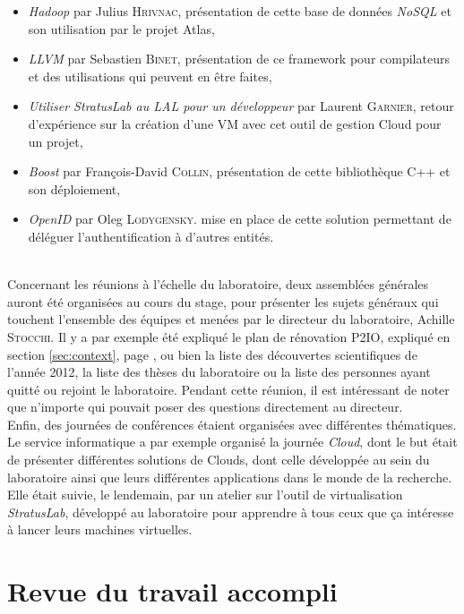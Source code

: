 \documentclass[12pt,a4paper,twoside]{report}
\begin{document}
\begin{itemize}
	\item \emph{Hadoop} par Julius \textsc{Hrivnac}, présentation de cette base
	de données \emph{NoSQL} et son utilisation par le projet Atlas,
	\item \emph{LLVM} par Sebastien \textsc{Binet}, présentation de ce
	framework pour compilateurs et des utilisations qui peuvent en être faites,
	\item \emph{Utiliser StratusLab au LAL pour un développeur} par Laurent
	\textsc{Garnier}, retour d’expérience sur la création d’une VM avec cet
	outil de gestion Cloud pour un projet,
	\item \emph{Boost} par François-David \textsc{Collin}, présentation de
	cette bibliothèque C++ et son déploiement,
	\item \emph{OpenID} par Oleg \textsc{Lodygensky}. mise en place de cette
	solution permettant de déléguer l’authentification à d’autres entités.
\end{itemize}
~\\

Concernant les réunions à l’échelle du laboratoire, deux assemblées générales
auront été organisées au cours du stage, pour présenter les sujets généraux qui
touchent l’ensemble des équipes et menées par le directeur du laboratoire,
Achille \textsc{Stocchi}. Il y a par exemple été expliqué le plan de rénovation
P2IO, expliqué en section \ref{sec:context}, page \pageref{sec:context}, ou
bien la liste des découvertes scientifiques de l’année 2012, la liste des
thèses du laboratoire ou la liste des personnes ayant quitté ou rejoint le
laboratoire. Pendant cette réunion, il est intéressant de noter que n’importe
qui pouvait poser des questions directement au directeur.\\

Enfin, des journées de conférences étaient organisées avec différentes
thématiques. Le service informatique a par exemple organisé la journée
\emph{Cloud}, dont le but était de présenter différentes solutions de Clouds,
dont celle développée au sein du laboratoire ainsi que leurs différentes
applications dans le monde de la recherche. Elle était suivie, le lendemain,
par un atelier sur l’outil de virtualisation \emph{StratusLab}, développé au
laboratoire pour apprendre à tous ceux que ça intéresse à lancer leurs machines
virtuelles.

\newpage

\section{Revue du travail accompli}
\end{document}
